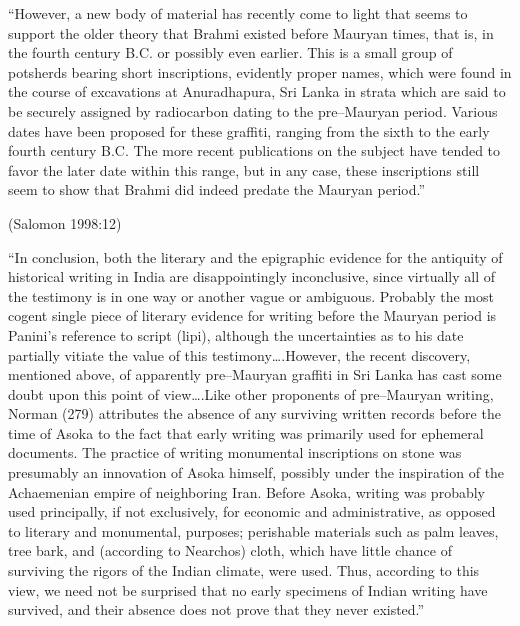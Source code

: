 \begin{myquote}
“However, a new body of material has recently come to light that seems to support the older theory that Brahmi existed before Mauryan times, that is, in the fourth century B.C. or possibly even earlier. This is a small group of potsherds bearing short inscriptions, evidently proper names, which were found in the course of excavations at Anuradhapura, Sri Lanka in strata which are said to be securely assigned by radiocarbon dating to the pre–Mauryan period. Various dates have been proposed for these graffiti, ranging from the sixth to the early fourth century B.C. The more recent publications on the subject have tended to favor the later date within this range, but in any case, these inscriptions still seem to show that Brahmi did indeed predate the Mauryan period.”
\end{myquote}

\hfill (Salomon 1998:12)

\begin{myquote}
“In conclusion, both the literary and the epigraphic evidence for the antiquity of historical writing in India are disappointingly inconclusive, since virtually all of the testimony is in one way or another vague or ambiguous. Probably the most cogent single piece of literary evidence for writing before the Mauryan period is Panini’s reference to script (lipi), although the uncertainties as to his date partially vitiate the value of this testimony….However, the recent discovery, mentioned above, of apparently pre–Mauryan graffiti in Sri Lanka has cast some doubt upon this point of view….Like other proponents of pre–Mauryan writing, Norman (279) attributes the absence of any surviving written records before the time of Asoka to the fact that early writing was primarily used for ephemeral documents. The practice of writing monumental inscriptions on stone was presumably an innovation of Asoka himself, possibly under the inspiration of the Achaemenian empire of neighboring Iran. Before Asoka, writing was probably used principally, if not exclusively, for economic and administrative, as opposed to literary and monumental, purposes; perishable materials such as palm leaves, tree bark, and (according to Nearchos) cloth, which have little chance of surviving the rigors of the Indian climate, were used. Thus, according to this view, we need not be surprised that no early specimens of Indian writing have survived, and their absence does not prove that they never existed.”
\end{myquote}

